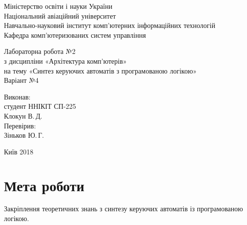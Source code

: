 \documentclass[a4paper,oneside,DIV=12,12pt,headings=normal]{scrartcl}
\begin{document}
	\begin{titlepage}
	\centering
		Міністерство освіти і науки України\\
		Національний авіаційний університет\\
		Навчально-науковий інститут комп'ютерних інформаційних технологій\\
		Кафедра комп'ютеризованих систем управління

		\vspace*{\fill}

		Лабораторна робота №2\\
		з дисципліни «Архітектура комп'ютерів»\\
		на тему «Синтез керуючих автоматів з програмованою логікою»\\
		Варіант №4

		\vspace*{\fill}
		
		\begin{flushright}
			Виконав:\\
			студент ННІКІТ СП-225\\
			Клокун В.\,Д.\\
			Перевірив:\\
			Зіньков Ю.\,Г.
		\end{flushright}

		Київ 2018
    \end{titlepage}
	
	\section{Мета роботи}
		Закріплення теоретичних знань з синтезу керуючих автоматів із програмованою логікою.
		
\end{document}
